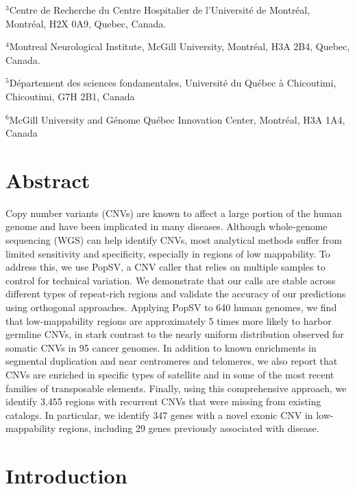 $^3$Centre de Recherche du Centre Hospitalier de l'Universit\'e de Montr\'eal, Montr\'eal, H2X 0A9, Quebec, Canada.

$^4$Montreal Neurological Institute, McGill University, Montr\'eal, H3A 2B4, Quebec, Canada.

$^5$D\'epartement des sciences fondamentales, Universit\'e du Qu\'ebec \`a  Chicoutimi, Chicoutimi, G7H 2B1, Canada

$^6$McGill University and G\'enome Qu\'ebec Innovation Center, Montr\'eal, H3A 1A4, Canada

\normalsize
\doublespacing

\section{Abstract}
Copy number variants (CNVs) are known to affect a large portion of the human genome and have been implicated in many diseases.
Although whole-genome sequencing (WGS) can help identify CNVs, most analytical methods suffer from limited sensitivity and specificity, especially in regions of low mappability.
To address this, we use {\sf PopSV}, a CNV caller that relies on multiple samples to control for technical variation.
We demonstrate that our calls are stable across different types of repeat-rich regions and validate the accuracy of our predictions using orthogonal approaches.
Applying {\sf PopSV} to 640 human genomes, we find that low-mappability regions are approximately 5 times more likely to harbor germline CNVs, in stark contrast to the nearly uniform distribution observed for somatic CNVs in 95 cancer genomes.
In addition to known enrichments in segmental duplication and near centromeres and telomeres, we also report that CNVs are enriched in specific types of satellite and in some of the most recent families of transposable elements.
Finally, using this comprehensive approach, we identify 3,455 regions with recurrent CNVs that were missing from existing catalogs.
In particular, we identify 347 genes with a novel exonic CNV in low-mappability regions, including 29 genes previously associated with disease.   


\section{Introduction}

